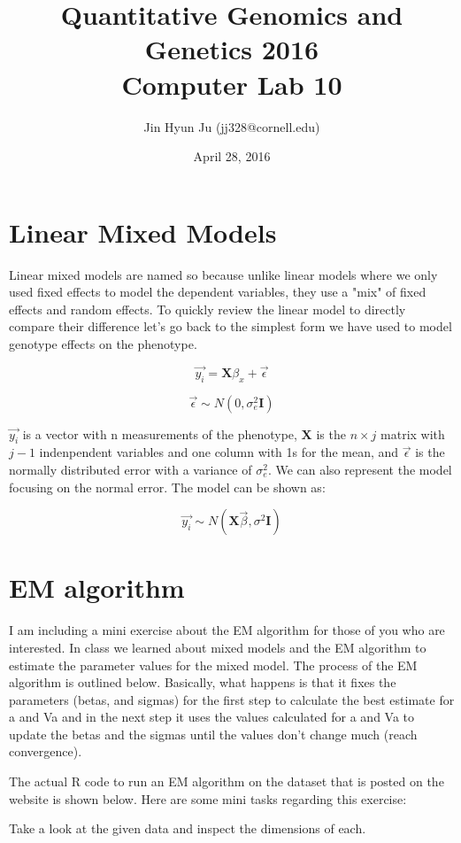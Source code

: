 \documentclass[11pt, oneside]{article}\usepackage[]{graphicx}\usepackage[]{color}
\title{Quantitative Genomics and Genetics 2016 \\ Computer Lab 10}
\author{Jin Hyun Ju (jj328@cornell.edu)}
\date{April 28, 2016}							%
\begin{document}
\maketitle


\section{Linear Mixed Models}

Linear mixed models are named so because unlike linear models where we only used fixed effects to model the dependent variables, they use a "mix" of fixed effects and random effects. To quickly review the linear model to directly compare their difference let's go back to the simplest form we have used to model genotype effects on the phenotype.

$$ \vec{y_i} =  \mathbf{X}\beta_x + \vec{\epsilon} $$

$$ \vec{\epsilon} \sim N(0, \sigma_e^2 \mathbf{I}) $$

$ \vec{y_i}$ is a vector with n measurements of the phenotype, $ \mathbf{X} $ is the $n \times j $ matrix with $ j -1 $ indenpendent variables and one column with 1s for the mean, and $ \vec{\epsilon} $ is the normally distributed error with a variance of $ \sigma_e^2 $. We can also represent the model focusing on the normal error. The model can be shown as:

$$ \vec{y_i} \sim N(\mathbf{X}\vec{\beta}, \sigma^2\mathbf{I}) $$

\section{EM algorithm}

I am including a mini exercise about the EM algorithm for those of you who are interested. In class we learned about mixed models and the EM algorithm to estimate the parameter values for the mixed model. The process of the EM algorithm is outlined below. Basically, what happens is that it fixes the parameters (betas, and sigmas) for the first step to calculate the best estimate for a and Va and in the next step it uses the values calculated for a and Va to update the betas and the sigmas until the values don't change much (reach convergence).

The actual R code to run an EM algorithm on the dataset that is posted on the website is shown below. Here are some mini tasks regarding this exercise:

Take a look at the given data and inspect the dimensions of each.
\end{document}

